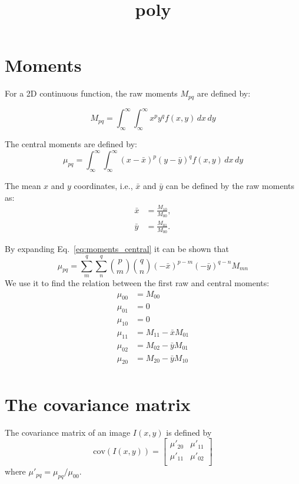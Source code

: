 \documentclass{article}
\begin{document}
\title{poly}

\section{Moments}

For a 2D continuous function, the raw moments $M_{pq}$ are defined by:

\begin{equation}
  M_{pq} = \int_\infty^\infty \int_\infty^\infty x^py^qf(x,y) \,dx\,dy
  \label{eq:moments_raw}
\end{equation}

The central moments are defined by:
\begin{equation}
  \mu_{pq} = \int_\infty^\infty \int_\infty^\infty (x-\bar{x})^p(y-\bar{y})^qf(x,y) \,dx\,dy
  \label{eq:moments_central}
\end{equation}

The mean $x$ and $y$ coordinates, i.e., $\bar{x}$ and $\bar{y}$ can be defined by the raw moments as:
\begin{align}
  \bar{x} & = \frac{M_{10}}{M_{00}},\\
  \bar{y} & = \frac{M_{01}}{M_{00}}.
\end{align}

By expanding Eq.~\ref{eq:moments_central} it can be shown that
\begin{equation}
  \mu_{pq} = \sum_m^q\sum_n^q \binom{p}{m}\binom{q}{n}(-\bar{x})^{p-m}(-\bar{y})^{q-n}M_{mn}
  \label{eq:raw_to_central}
  \end{equation}
We use it to find the relation between the first raw and central moments:
\begin{align} %
  \mu_{00} & = M_{00}\\
  \mu_{01} & = 0 \\
  \mu_{10} & = 0 \\
  \mu_{11} & = M_{11} - \bar{x}M_{01} \\
  \mu_{02} & = M_{02} - \bar{y}M_{01} \\
  \mu_{20} & = M_{20} - \bar{y}M_{10} \\
  \end{align}

\section{The covariance matrix}
The covariance matrix of an image $I(x,y)$ is defined by
\begin{equation}
  \text{cov}\left(I(x,y)\right) =
  \begin{bmatrix}
    \mu'_{20} & \mu'_{11} \\
    \mu'_{11} & \mu'_{02} \\
  \end{bmatrix}
\end{equation}
where $\mu'_{pq} = \mu_{pq}/\mu_{00}$.
\end{document}
